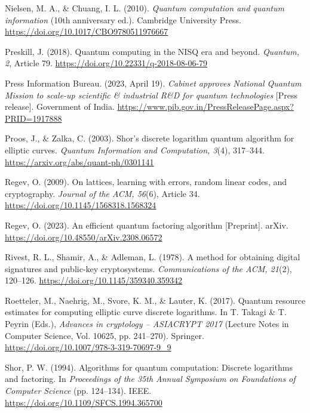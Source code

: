 \documentclass[12pt,oneside]{report}
\begin{document}
Nielsen, M. A., \& Chuang, I. L. (2010). \textit{Quantum computation and quantum information} (10th anniversary ed.). Cambridge University Press. \url{https://doi.org/10.1017/CBO9780511976667}
\par

Preskill, J. (2018). Quantum computing in the NISQ era and beyond. \textit{Quantum, 2}, Article 79. \url{https://doi.org/10.22331/q-2018-08-06-79}
\par

Press Information Bureau. (2023, April 19). \textit{Cabinet approves National Quantum Mission to scale-up scientific \& industrial R\&D for quantum technologies} [Press release]. Government of India. \url{https://www.pib.gov.in/PressReleasePage.aspx?PRID=1917888}
\par

Proos, J., \& Zalka, C. (2003). Shor's discrete logarithm quantum algorithm for elliptic curves. \textit{Quantum Information and Computation, 3}(4), 317–344. \url{https://arxiv.org/abs/quant-ph/0301141}
\par

Regev, O. (2009). On lattices, learning with errors, random linear codes, and cryptography. \textit{Journal of the ACM, 56}(6), Article 34. \url{https://doi.org/10.1145/1568318.1568324}
\par

Regev, O. (2023). An efficient quantum factoring algorithm [Preprint]. arXiv. \url{https://doi.org/10.48550/arXiv.2308.06572}
\par

Rivest, R. L., Shamir, A., \& Adleman, L. (1978). A method for obtaining digital signatures and public-key cryptosystems. \textit{Communications of the ACM, 21}(2), 120–126. \url{https://doi.org/10.1145/359340.359342}
\par

Roetteler, M., Naehrig, M., Svore, K. M., \& Lauter, K. (2017). Quantum resource estimates for computing elliptic curve discrete logarithms. In T. Takagi \& T. Peyrin (Eds.), \textit{Advances in cryptology – ASIACRYPT 2017} (Lecture Notes in Computer Science, Vol. 10625, pp. 241–270). Springer. \url{https://doi.org/10.1007/978-3-319-70697-9_9}
\par

Shor, P. W. (1994). Algorithms for quantum computation: Discrete logarithms and factoring. In \textit{Proceedings of the 35th Annual Symposium on Foundations of Computer Science} (pp. 124–134). IEEE. \url{https://doi.org/10.1109/SFCS.1994.365700}
\par
\end{document}
